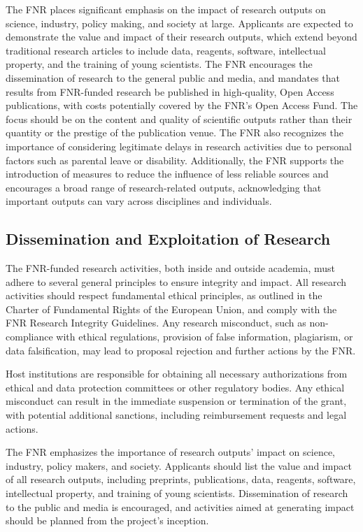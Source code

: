 \documentclass[12pt]{article}
\begin{document}
The FNR places significant emphasis on the impact of research outputs on science, industry, policy making, and society at large. Applicants are expected to demonstrate the value and impact of their research outputs, which extend beyond traditional research articles to include data, reagents, software, intellectual property, and the training of young scientists. The FNR encourages the dissemination of research to the general public and media, and mandates that results from FNR-funded research be published in high-quality, Open Access publications, with costs potentially covered by the FNR’s Open Access Fund. The focus should be on the content and quality of scientific outputs rather than their quantity or the prestige of the publication venue. The FNR also recognizes the importance of considering legitimate delays in research activities due to personal factors such as parental leave or disability. Additionally, the FNR supports the introduction of measures to reduce the influence of less reliable sources and encourages a broad range of research-related outputs, acknowledging that important outputs can vary across disciplines and individuals.

\subsection{Dissemination and Exploitation of Research}

The FNR-funded research activities, both inside and outside academia, must adhere to several general principles to ensure integrity and impact. All research activities should respect fundamental ethical principles, as outlined in the Charter of Fundamental Rights of the European Union, and comply with the FNR Research Integrity Guidelines. Any research misconduct, such as non-compliance with ethical regulations, provision of false information, plagiarism, or data falsification, may lead to proposal rejection and further actions by the FNR.

Host institutions are responsible for obtaining all necessary authorizations from ethical and data protection committees or other regulatory bodies. Any ethical misconduct can result in the immediate suspension or termination of the grant, with potential additional sanctions, including reimbursement requests and legal actions.

The FNR emphasizes the importance of research outputs' impact on science, industry, policy makers, and society. Applicants should list the value and impact of all research outputs, including preprints, publications, data, reagents, software, intellectual property, and training of young scientists. Dissemination of research to the public and media is encouraged, and activities aimed at generating impact should be planned from the project's inception.
\end{document}

